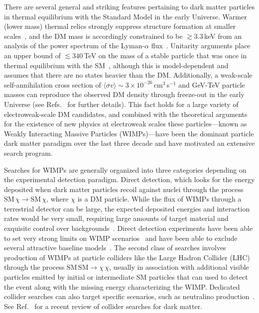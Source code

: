 There are several general and striking features pertaining to dark matter particles in thermal equilibrium with the Standard Model in the early Universe. Warmer (lower mass) thermal relics strongly suppress structure formation at smaller scales~\cite{Bringmann:2006mu}, and the DM mass is accordingly constrained to be $\gtrsim 3.3$\,keV from an analysis of the power spectrum of the Lyman-$\alpha$ flux~\cite{Viel:2013apy}. Unitarity arguments place an upper bound of $\lesssim340$\,TeV on the mass of a stable particle that was once in thermal equilibrium with the SM~\cite{Griest:1989wd}, although this is model-dependent and assumes that there are no states heavier than the DM. Additionally, a weak-scale self-annihilation cross section of $\langle\sigma v\rangle\sim 3\times10^{-26}$\,cm$^3$\,s$^{-1}$ and GeV-TeV particle masses can reproduce the observed DM density through freeze-out in the early Universe (see Refs.~\cite{1991NuPhB.360..145G,1996PhR...267..195J,Lisanti:2016jxe} for further details). This fact holds for a large variety of electroweak-scale DM candidates, and combined with the theoretical arguments for the existence of new physics at electroweak scales these particles---known as Weakly Interacting Massive Particles (WIMPs)---have been the dominant particle dark matter paradigm over the last three decade and have motivated an extensive search program. 

Searches for WIMPs are generally organized into three categories depending on the experimental detection paradigm. Direct detection, which looks for the energy deposited when dark matter particles recoil against nuclei through the process $\text{SM}\,\chi\rightarrow\text{SM}\,\chi$, where $\chi$ is a DM particle. While the flux of WIMPs through a terrestrial detector can be large, the expected deposited energies and interaction rates would be very small, requiring large amounts of target material and exquisite control over backgrounds~\cite{Lisanti:2016jxe}. Direct detection experiments have been able to set very strong limits on WIMP scenarios~\cite{Aprile:2018dbl} and have been able to exclude several attractive baseline models~\cite{Escudero:2016gzx}. The second class of searches involves production of WIMPs at particle colliders like the Large Hadron Collider (LHC) through the process $\mathrm{SM}\,\mathrm{SM}\rightarrow\chi\,\chi$, usually in association with additional visible particles emitted by initial or intermediate SM particles that can used to detect the event along with the missing energy characterizing the WIMP. Dedicated collider searches can also target specific scenarios, such as neutralino production~\cite{Patrignani:2016xqp}. See Ref.~\cite{Kahlhoefer:2017dnp} for a recent review of collider searches for dark matter.

